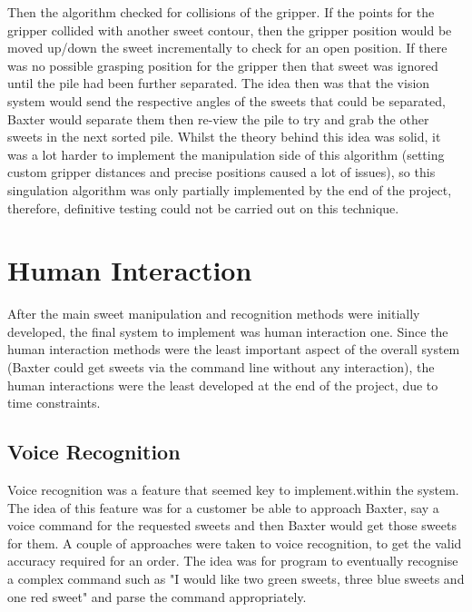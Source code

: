 Then the algorithm checked for collisions of the gripper. If the points for the gripper collided with another sweet contour, then the gripper position would be moved up/down the sweet incrementally to check for an open position. If there was no possible grasping position for the gripper then that sweet was ignored until the pile had been further separated. The idea then was that the vision system would send the respective angles of the sweets that could be separated, Baxter would separate them then re-view the pile to try and grab the other sweets in the next sorted pile. Whilst the theory behind this idea was solid, it was a lot harder to implement the manipulation side of this algorithm (setting custom gripper distances and precise positions caused a lot of issues), so this singulation algorithm was only partially implemented by the end of the project, therefore, definitive testing could not be carried out on this technique.
\section{Human Interaction}
After the main sweet manipulation and recognition methods were initially developed, the final system to implement was human interaction one. Since the human interaction methods were the least important aspect of the overall system (Baxter could get sweets via the command line without any interaction), the human interactions were the least developed at the end of the project, due to time constraints.
\subsection{Voice Recognition}
Voice recognition was a feature that seemed key to implement.within the system. The idea of this feature was for a customer be able to approach Baxter, say a voice command for the requested sweets and then Baxter would get those sweets for them. A couple of approaches were taken to voice recognition, to get the valid accuracy required for an order. The idea was for program to eventually recognise a complex command such as "I would like two green sweets, three blue sweets and one red sweet" and parse the command appropriately.

